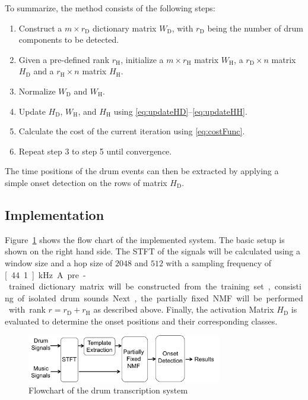 \documentclass[a4paper]{article}
\newcommand{\figref}[1]{\mbox{Figure~\ref{#1}}}
\begin{document}
To summarize, the method consists of the following steps:
\begin{enumerate}
    \item   Construct a $m \times r_\mathrm{D}$ dictionary matrix $W_\mathrm{D}$, with $r_\mathrm{D}$ being the number of drum components to be detected.
    \item   Given a pre-defined rank $r_\mathrm{H}$, initialize a $m \times r_\mathrm{H}$ matrix $W_\mathrm{H}$, a $r_\mathrm{D} \times n$ matrix $H_\mathrm{D}$ and a $r_\mathrm{H} \times n$ matrix $H_\mathrm{H}$.
    \item   Normalize $W_\mathrm{D}$ and $W_\mathrm{H}$. 
    \item   Update $H_\mathrm{D}$, $W_\mathrm{H}$, and $H_\mathrm{H}$ using \eqref{eq:updateHD}--\eqref{eq:updateHH}.
    \item   Calculate the cost of the current iteration using \eqref{eq:costFunc}.
    \item   Repeat step 3 to step 5 until convergence.
\end{enumerate}
The time positions of the drum events can then be extracted by applying a simple onset detection on the rows of matrix $H_\mathrm{D}$.

\subsection{Implementation}\label{subsec:processing steps}

\figref{fig:flowchart} shows the flow chart of the implemented system. The basic setup is shown on the right hand side. 
The STFT of the signals will be calculated using a window size and a hop size of $2048$ and $512$ with a sampling frequency of \unit[44.1]{kHz}. 
A pre-trained dictionary matrix will be constructed from the training set, consisting of isolated drum sounds. 
Next, the partially fixed NMF will be performed with rank $r = r_\mathrm{D} + r_\mathrm{H}$ as described above. 
Finally, the activation Matrix $H_\mathrm{D}$ is evaluated to determine the onset positions and their corresponding classes.  

\begin{figure}
 \centerline{%
 \includegraphics[width=8.5cm]{flowchart.png}}%
 \caption{Flowchart of the drum transcription system} %
 \label{fig:flowchart}
\end{figure}
\end{document}

